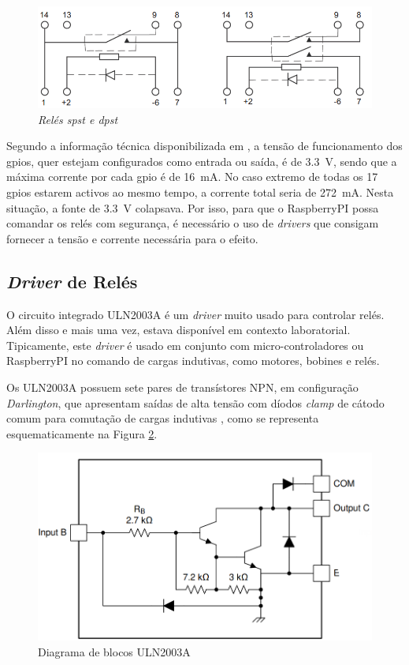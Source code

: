 \begin{figure}[hbtp]
    \centering
    \includegraphics[width=1\textwidth]{figures/reles.png}
    \caption{\textit{Relés \acrshort{spst} e \acrshort{dpst}} \cite{DryRelay}}
    \label{fig:reles}
\end{figure}

Segundo a informação técnica disponibilizada em \cite{Raspberrytech}, a tensão de funcionamento dos \acrfull{gpio}s, quer estejam configurados como entrada ou saída, é de \SI{3.3}{\volt}, sendo que a máxima corrente por cada \acrshort{gpio} é de \SI{16}{\mA}. No caso extremo de todas os 17 \acrshort{gpio}s estarem activos ao mesmo tempo, a corrente total seria de \SI{272}{\mA}. Nesta situação, a fonte de \SI{3.3}{\volt} colapsava.
Por isso, para que o RaspberryPI possa comandar os relés com segurança, é necessário o uso de \textit{drivers} que consigam fornecer a tensão e corrente necessária para o efeito.

\subsection{\textit{Driver} de Relés}
O circuito integrado ULN2003A é um \textit{driver} muito usado para controlar relés. Além disso e mais uma vez, estava disponível em contexto laboratorial.
Tipicamente, este \textit{driver} é usado em conjunto com micro-controladores ou \gls{RaspberryPI} no comando de cargas indutivas, como motores, bobines e relés.

Os ULN2003A possuem sete pares de transístores NPN, em configuração \textit{Darlington}, que apresentam saídas de alta tensão com díodos \textit{clamp} de cátodo comum para comutação de cargas indutivas \cite{ULN2003}, como se  representa esquematicamente na Figura \ref{fig:2003blocos}.

\begin{figure}[hbtp]
    \centering
    \includegraphics[width=1\textwidth]{figures/2003A_Darling.png}
    \caption{Diagrama de blocos ULN2003A \cite{ULN2003}}
    \label{fig:2003blocos}
\end{figure}

